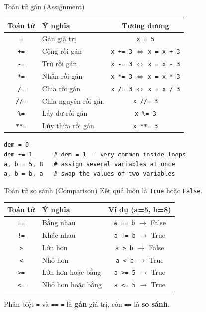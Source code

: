 \documentclass[11pt]{beamer}
\begin{document}
\begin{frame}[fragile]{Toán tử gán (Assignment)}
\begin{center}
\begin{tabular}{|c|l|c|}
\hline
\textbf{Toán tử} & \textbf{Ý nghĩa} & \textbf{Tương đương} \\
\hline
\texttt{=}   & Gán giá trị        & \texttt{x = 5} \\
\texttt{+=}  & Cộng rồi gán       & \texttt{x += 3} $\Leftrightarrow$ \texttt{x = x + 3} \\
\texttt{-=}  & Trừ rồi gán        & \texttt{x -= 3} $\Leftrightarrow$ \texttt{x = x - 3} \\
\texttt{*=}  & Nhân rồi gán       & \texttt{x *= 3} $\Leftrightarrow$ \texttt{x = x * 3} \\
\texttt{/=}  & Chia rồi gán       & \texttt{x /= 3} $\Leftrightarrow$ \texttt{x = x / 3} \\
\texttt{//=} & Chia nguyên rồi gán& \texttt{x //= 3} \\
\texttt{\%=} & Lấy dư rồi gán     & \texttt{x \%= 3} \\
\texttt{**=} & Lũy thừa rồi gán   & \texttt{x **= 3} \\
\hline
\end{tabular}
\end{center}
\begin{lstlisting}
dem = 0
dem += 1      # dem = 1  - very common inside loops
a, b = 5, 8   # assign several variables at once
a, b = b, a   # swap the values of two variables
\end{lstlisting}
\end{frame}

\begin{frame}[fragile]{Toán tử so sánh (Comparison)}
Kết quả luôn là \texttt{True} hoặc \texttt{False}.
\begin{center}
\begin{tabular}{|c|l|c|}
\hline
\textbf{Toán tử} & \textbf{Ý nghĩa} & \textbf{Ví dụ (a=5, b=8)} \\
\hline
\texttt{==} & Bằng nhau        & \texttt{a == b} $\to$ False \\
\texttt{!=} & Khác nhau        & \texttt{a != b} $\to$ True \\
\texttt{>}  & Lớn hơn          & \texttt{a > b} $\to$ False \\
\texttt{<}  & Nhỏ hơn          & \texttt{a < b} $\to$ True \\
\texttt{>=} & Lớn hơn hoặc bằng& \texttt{a >= 5} $\to$ True \\
\texttt{<=} & Nhỏ hơn hoặc bằng& \texttt{a <= 5} $\to$ True \\
\hline
\end{tabular}
\end{center}
\begin{alertblock}{Phân biệt \texttt{=} và \texttt{==}}
\texttt{=} là \textbf{gán} giá trị, còn \texttt{==} là \textbf{so sánh}.
\end{alertblock}
\end{frame}
\end{document}
